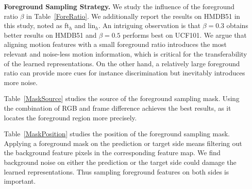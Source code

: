 \documentclass[sigconf,screen]{acmart}
\begin{document}
\noindent
{\bf Foreground Sampling Strategy.} We study the influence of the foreground ratio $\beta$ in Table~\ref{ForeRatio}. We additionally report the results on HMDB51 in this study, noted as ft$_h$ and lin$_h$. An intriguing observation is that $\beta=0.3$ obtains better results on HMDB51 and $\beta=0.5$ performs best on UCF101. We argue that aligning motion features with a small foreground ratio introduces the most relevant and noise-less motion information, which is critical for the transferability of the learned representations. On the other hand, a relatively large foreground ratio can provide more cues for instance discrimination but inevitably introduces more noise.

Table~\ref{MaskSource} studies the source of the foreground sampling mask. Using the combination of RGB and frame difference achieves the best results, as it locates the foreground region more precisely.

Table~\ref{MaskPosition} studies the position of the foreground sampling mask. Applying a foreground mask on the prediction or target side means filtering out the background feature pixels in the corresponding feature map. We find background noise on either the prediction or the target side could damage the learned representations. Thus sampling foreground features on both sides is important.
\end{document}
